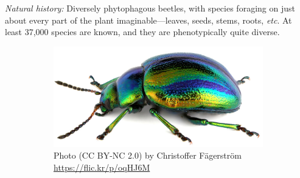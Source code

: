 \documentclass[letterpaper, 11pt]{article}
\begin{document}
\noindent{}\textit{Natural history:} Diversely phytophagous beetles, with species foraging on just about every part of the plant imaginable---leaves, seeds, stems, roots, \textit{etc}. At least 37,000 species are known, and they are phenotypically quite diverse.\\

\begin{figure}[ht!]
  \centering
\begin{subfigure}[ht!]{0.5\textwidth}
    \includegraphics[width=\textwidth]{Chrysomelid1}
  \caption{Photo (CC BY-NC 2.0) by Christoffer F\"{a}gerstr\"{o}m  \url{https://flic.kr/p/oqHJ6M}}
  \label{fig:chrysomelid1}
\end{subfigure}
    ~
 \begin{subfigure}[ht!]{0.23\textwidth}

\end{subfigure}
\end{figure}
\end{document}
